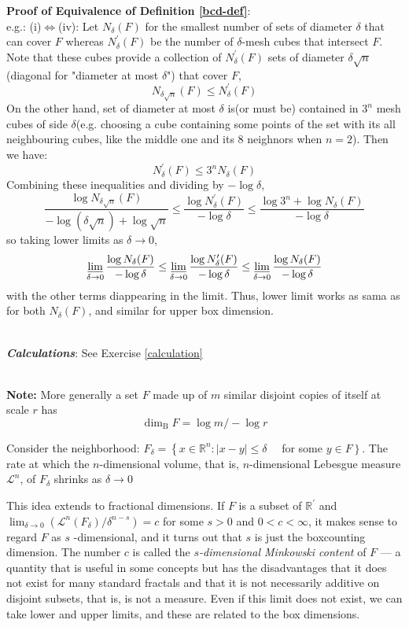 \textbf{Proof of Equivalence of Definition \ref{bcd-def}}:\\
e.g.: (i)$\Leftrightarrow$(iv): Let $N_\delta(F)$ for the smallest number of sets of diameter $\delta$ that can cover $F$ whereas $N_\delta^\prime(F)$ be the number of $\delta$-mesh cubes that intersect $F$. 
Note that these cubes provide a collection of $N_\delta^\prime(F)$ sets of diameter $\delta\sqrt{n}$(diagonal for "diameter at most $\delta$") that cover $F$, $$N_{\delta\sqrt{n}}(F)\leq N_\delta^\prime(F)$$
On the other hand, set of diameter at most $\delta$ is(or must be) contained in $3^n$ mesh cubes of side $\delta$(e.g. choosing a cube containing some points of the set with its all neighbouring cubes, like the middle one and its 8 neighnors when $n=2$). Then we have:
$$ N_\delta^\prime(F) \leq 3^n N_\delta(F)$$
Combining these inequalities and dividing by $-\log \delta$,
$$
\frac{\log N_{\delta \sqrt{n}}(F)}{-\log (\delta \sqrt{n})+\log \sqrt{n}} \leq \frac{\log N_{\delta}^{\prime}(F)}{-\log \delta} \leq \frac{\log 3^{n}+\log N_{\delta}(F)}{-\log \delta}
$$
so taking lower limits as $\delta \rightarrow 0$,
$$\varliminf_{\delta \rightarrow 0} \frac{\log N_{\delta}(F)}{-\log \delta} \leq \varliminf_{\delta \rightarrow 0} \frac{\log N_{\delta}^{\prime}(F)}{-\log \delta} \leq \varliminf_{\delta \rightarrow 0} \frac{\log N_{\delta}(F)}{-\log \delta}$$
with the other terms diappearing in the limit. Thus, lower limit works as sama as for both $N_\delta(F)$, and similar for upper box dimension. 

\textbf{\textit{\\Calculations}}: See Exercise \ref{calculation}

\textbf{\\Note: }More generally a set $F$ made up of $m$ similar disjoint copies of itself at scale $r$ has $$\operatorname{dim}_{\mathrm{B}} F=\log m /-\log r$$

Consider the neighborhood: $F_{\delta}=\left\{x \in \mathbb{R}^{n}:|x-y| \leq \delta \quad\right.$ for some $\left.y \in F\right\}$. The rate at which the $n$-dimensional volume, that is, $n$-dimensional Lebesgue measure $\mathcal{L}^n$, of $F_\delta$ shrinks as $\delta\rightarrow 0$

This idea extends to fractional dimensions. If $F$ is a subset of $\mathbb{R}^{\prime}$ and $\displaystyle\lim _{\delta \rightarrow 0}\left(\mathcal{L}^{n}\left(F_{\delta}\right) / \delta^{n-s}\right)=c$ for some $s>0$ and $0<c<\infty$, it makes sense to
regard $F$ as $s$ -dimensional, and it turns out that $s$ is just the boxcounting dimension. The number $c$ is called the \textit{$s$-dimensional Minkowski content} of $F$ --- a quantity that is useful in some concepts but has the disadvantages that it does not exist for many standard fractals and that it is not necessarily additive on disjoint subsets, that is, is not a measure. Even if this limit does not exist, we can take lower and upper limits, and these are related to the box dimensions.


